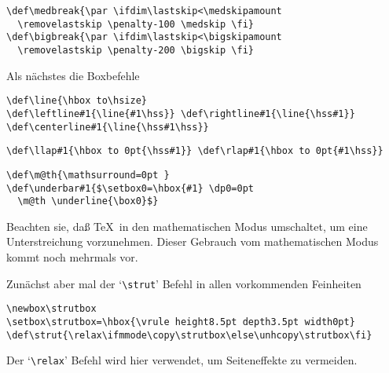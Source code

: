 \begin{appendix}
\begin{verbatim}
\def\medbreak{\par \ifdim\lastskip<\medskipamount
  \removelastskip \penalty-100 \medskip \fi}
\def\bigbreak{\par \ifdim\lastskip<\bigskipamount
  \removelastskip \penalty-200 \bigskip \fi}
\end{verbatim}
Als n\"achstes die Boxbefehle
\begin{verbatim}
\def\line{\hbox to\hsize}
\def\leftline#1{\line{#1\hss}} \def\rightline#1{\line{\hss#1}}
\def\centerline#1{\line{\hss#1\hss}}
\end{verbatim}
\begin{verbatim}
\def\llap#1{\hbox to 0pt{\hss#1}} \def\rlap#1{\hbox to 0pt{#1\hss}}
\end{verbatim}
\begin{verbatim}
\def\m@th{\mathsurround=0pt }
\def\underbar#1{$\setbox0=\hbox{#1} \dp0=0pt
  \m@th \underline{\box0}$}
\end{verbatim}
Beachten sie, da\ss{} \TeX\ in den mathematischen Modus umschaltet, um
eine Unterstreichung vorzunehmen. Dieser Gebrauch vom mathematischen
Modus kommt noch mehrmals vor.

Zun\"achst aber mal der `\verb|\strut|' Befehl in allen vorkommenden
Feinheiten
\begin{verbatim}
\newbox\strutbox
\setbox\strutbox=\hbox{\vrule height8.5pt depth3.5pt width0pt}
\def\strut{\relax\ifmmode\copy\strutbox\else\unhcopy\strutbox\fi}
\end{verbatim}
Der `\verb|\relax|' Befehl wird hier verwendet, um Seiteneffekte zu
vermeiden.


\end{appendix}
